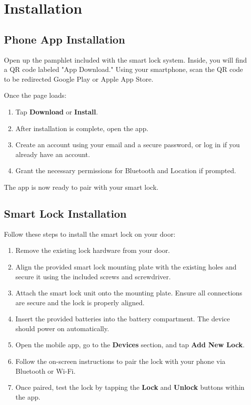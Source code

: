 \newpage
\section{Installation}

\subsection{Phone App Installation}
Open up the pamphlet included with the smart lock system. Inside, you will find a QR code labeled "App Download." Using your smartphone, scan the QR code to be redirected Google Play or Apple App Store.

Once the page loads:
\begin{enumerate}
    \item Tap \textbf{Download} or \textbf{Install}.
    \item After installation is complete, open the app.
    \item Create an account using your email and a secure password, or log in if you already have an account.
    \item Grant the necessary permissions for Bluetooth and Location if prompted.
\end{enumerate}

The app is now ready to pair with your smart lock.

\subsection{Smart Lock Installation}
Follow these steps to install the smart lock on your door:

\begin{enumerate}
    \item Remove the existing lock hardware from your door.
    \item Align the provided smart lock mounting plate with the existing holes and secure it using the included screws and screwdriver.
    \item Attach the smart lock unit onto the mounting plate. Ensure all connections are secure and the lock is properly aligned.
    \item Insert the provided batteries into the battery compartment. The device should power on automatically.
    \item Open the mobile app, go to the \textbf{Devices} section, and tap \textbf{Add New Lock}.
    \item Follow the on-screen instructions to pair the lock with your phone via Bluetooth or Wi-Fi.
    \item Once paired, test the lock by tapping the \textbf{Lock} and \textbf{Unlock} buttons within the app.
\end{enumerate}

